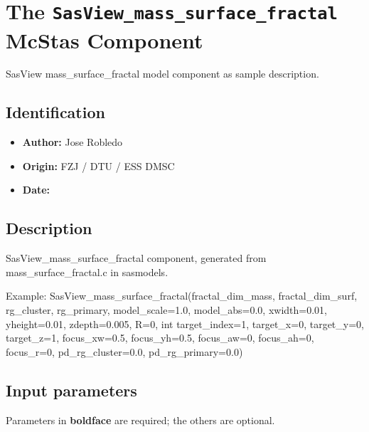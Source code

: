 \section{The \texttt{SasView\_mass\_surface\_fractal} McStas Component}
SasView mass\_surface\_fractal model component as sample description.

\subsection*{Identification}
\begin{itemize}
  \item \textbf{Author:} Jose Robledo
  \item \textbf{Origin:} FZJ / DTU / ESS DMSC
  \item \textbf{Date:} 
\end{itemize}

\subsection*{Description}
SasView\_mass\_surface\_fractal component, generated from mass\_surface\_fractal.c in sasmodels.

Example: SasView\_mass\_surface\_fractal(fractal\_dim\_mass, fractal\_dim\_surf, rg\_cluster, rg\_primary, model\_scale=1.0, model\_abs=0.0, xwidth=0.01, yheight=0.01, zdepth=0.005, R=0, int target\_index=1, target\_x=0, target\_y=0, target\_z=1, focus\_xw=0.5, focus\_yh=0.5, focus\_aw=0, focus\_ah=0, focus\_r=0, pd\_rg\_cluster=0.0, pd\_rg\_primary=0.0)

\subsection*{Input parameters}
Parameters in \textbf{boldface} are required; the others are optional.


